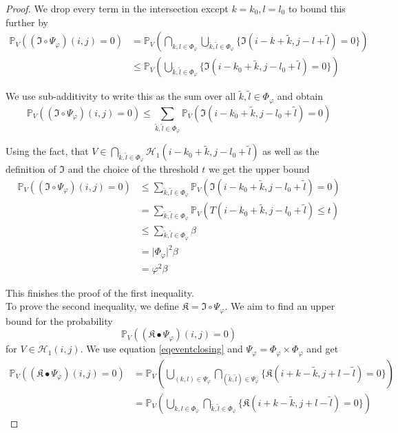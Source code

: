 \documentclass[a4paper,12pt]{article}
\newcommand{\abs}[1]{\lvert#1\rvert}
\theoremstyle{plain}
\theoremstyle{definition}
\begin{document}
\begin{proof}
	We drop every term in the intersection except $k = k_0, l = l_0$ to bound this further by
	\begin{align*}
		\mathbb{P}_V( (\mathfrak{I} \circ \Psi_\varphi)(i, j) = 0 ) &= \mathbb{P}_V\left( \bigcap_{k, l \in \Phi_\varphi} \bigcup_{\tilde{k}, \tilde{l} \in \Phi_\varphi} \{ \mathfrak{I}(i - k + \tilde{k}, j - l + \tilde{l}) = 0 \} \right) \\
		&\leq \mathbb{P}_V\left( \bigcup_{\tilde{k}, \tilde{l} \in \Phi_\varphi} \{ \mathfrak{I}(i - k_0 + \tilde{k}, j - l_0 + \tilde{l}) = 0 \} \right)
	\end{align*}
	
	We use sub-additivity to write this as the sum over all $\tilde{k}, \tilde{l} \in \Phi_\varphi$ and obtain
	\begin{equation*}
		\mathbb{P}_V( (\mathfrak{I} \circ \Psi_\varphi)(i, j) = 0 ) \leq \sum_{\tilde{k}, \tilde{l} \in \Phi_\varphi} \mathbb{P}_V\left( \mathfrak{I}(i - k_0 + \tilde{k}, j - l_0 + \tilde{l}) = 0 \right)
	\end{equation*}
	
	Using the fact, that $V \in \bigcap_{\tilde{k}, \tilde{l} \in \Phi_\varphi} \mathcal{H}_1(i - k_0 + \tilde{k}, j - l_0 + \tilde{l})$ as well as the definition of $\mathfrak{I}$ and the choice of the threshold $t$ we get the upper bound
	\begin{align*}
		\mathbb{P}_V( (\mathfrak{I} \circ \Psi_\varphi)(i, j) = 0 ) &\leq \sum_{\tilde{k}, \tilde{l} \in \Phi_\varphi} \mathbb{P}_V\left( \mathfrak{I}(i - k_0 + \tilde{k}, j - l_0 + \tilde{l}) = 0 \right) \\
		&= \sum_{\tilde{k}, \tilde{l} \in \Phi_\varphi} \mathbb{P}_V\left( T(i - k_0 + \tilde{k}, j - l_0 + \tilde{l}) \leq t \right) \\
		&\leq \sum_{\tilde{k}, \tilde{l} \in \Phi_\varphi} \beta \\
		&= \abs{\Phi_\varphi}^2 \beta \\
		&= \varphi^2 \beta
	\end{align*}
	
	This finishes the proof of the first inequality.\\
	
	
	To prove the second inequality, we define $\mathfrak{K} = \mathfrak{I} \circ \Psi_\varphi$. We aim to find an upper bound for the probability
	\begin{equation*}
		\mathbb{P}_V( (\mathfrak{K} \bullet \Psi_\varphi)(i, j) = 0 )
	\end{equation*}
	for $V \in \mathcal{H}_1(i, j)$. We use equation \eqref{eqeventclosing} and $\Psi_\varphi = \Phi_\varphi \times \Phi_\varphi$ and get
	\begin{align*}
		\mathbb{P}_V( (\mathfrak{K} \bullet \Psi_\varphi)(i, j) = 0 ) &= \mathbb{P}_V\left( \bigcup_{(k, l) \in \Psi_\varphi} \bigcap_{(\tilde{k}, \tilde{l}) \in \Psi_\varphi} \{ \mathfrak{K}(i + k - \tilde{k}, j + l - \tilde{l}) = 0 \} \right) \\
		&= \mathbb{P}_V\left( \bigcup_{k, l \in \Phi_\varphi} \bigcap_{\tilde{k}, \tilde{l} \in \Phi_\varphi} \{ \mathfrak{K}(i + k - \tilde{k}, j + l - \tilde{l}) = 0 \} \right)
	\end{align*}
	

\end{proof}
\end{document}
